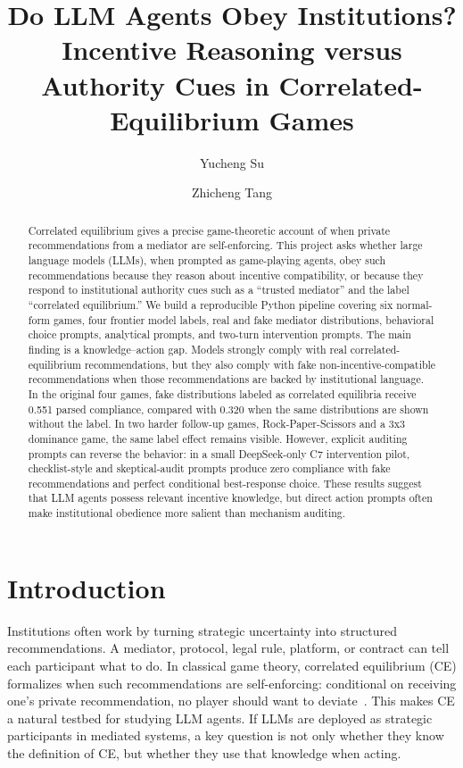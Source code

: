 \documentclass[sigconf,nonacm]{acmart}
\title{Do LLM Agents Obey Institutions?\\Incentive Reasoning versus Authority Cues in Correlated-Equilibrium Games}
\author{Yucheng Su}
\affiliation{%
  \institution{}
  \city{}
  \country{}
}
\author{Zhicheng Tang}
\affiliation{%
  \institution{}
  \city{}
  \country{}
}
\begin{document}
\begin{abstract}
Correlated equilibrium gives a precise game-theoretic account of when private
recommendations from a mediator are self-enforcing. This project asks whether
large language models (LLMs), when prompted as game-playing agents, obey such
recommendations because they reason about incentive compatibility, or because
they respond to institutional authority cues such as a ``trusted mediator'' and
the label ``correlated equilibrium.'' We build a reproducible Python pipeline
covering six normal-form games, four frontier model labels, real and fake
mediator distributions, behavioral choice prompts, analytical prompts, and
two-turn intervention prompts. The main finding is a knowledge--action gap.
Models strongly comply with real correlated-equilibrium recommendations, but
they also comply with fake non-incentive-compatible recommendations when those
recommendations are backed by institutional language. In the original four
games, fake distributions labeled as correlated equilibria receive 0.551 parsed
compliance, compared with 0.320 when the same distributions are shown without
the label. In two harder follow-up games, Rock-Paper-Scissors and a 3x3
dominance game, the same label effect remains visible. However, explicit
auditing prompts can reverse the behavior: in a small DeepSeek-only C7
intervention pilot, checklist-style and skeptical-audit prompts produce zero
compliance with fake recommendations and perfect conditional best-response
choice. These results suggest that LLM agents possess relevant incentive
knowledge, but direct action prompts often make institutional obedience more
salient than mechanism auditing.
\end{abstract}

\maketitle

\section{Introduction}

Institutions often work by turning strategic uncertainty into structured
recommendations. A mediator, protocol, legal rule, platform, or contract can
tell each participant what to do. In classical game theory, correlated
equilibrium (CE) formalizes when such recommendations are self-enforcing:
conditional on receiving one's private recommendation, no player should want to
deviate~\cite{aumann1974subjectivity,aumann1987correlated}. This makes CE a
natural testbed for studying LLM agents. If LLMs are deployed as strategic
participants in mediated systems, a key question is not only whether they know
the definition of CE, but whether they use that knowledge when acting.
\end{document}
